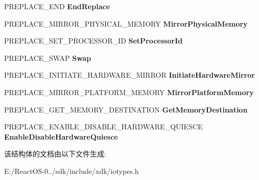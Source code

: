\begin{DoxyCompactItemize}
P\+R\+E\+P\+L\+A\+C\+E\+\_\+\+E\+ND {\bfseries End\+Replace}
\item 
\mbox{\label{struct___p_n_p___r_e_p_l_a_c_e___d_r_i_v_e_r___i_n_t_e_r_f_a_c_e_a1d3a4f853a6a4c31257f8b91adc3f37c}} 
P\+R\+E\+P\+L\+A\+C\+E\+\_\+\+M\+I\+R\+R\+O\+R\+\_\+\+P\+H\+Y\+S\+I\+C\+A\+L\+\_\+\+M\+E\+M\+O\+RY {\bfseries Mirror\+Physical\+Memory}
\item 
\mbox{\label{struct___p_n_p___r_e_p_l_a_c_e___d_r_i_v_e_r___i_n_t_e_r_f_a_c_e_a89aadae61d7ebc41005524606f802240}} 
P\+R\+E\+P\+L\+A\+C\+E\+\_\+\+S\+E\+T\+\_\+\+P\+R\+O\+C\+E\+S\+S\+O\+R\+\_\+\+ID {\bfseries Set\+Processor\+Id}
\item 
\mbox{\label{struct___p_n_p___r_e_p_l_a_c_e___d_r_i_v_e_r___i_n_t_e_r_f_a_c_e_af0740fabd446d085af9b98a923b95cd2}} 
P\+R\+E\+P\+L\+A\+C\+E\+\_\+\+S\+W\+AP {\bfseries Swap}
\item 
\mbox{\label{struct___p_n_p___r_e_p_l_a_c_e___d_r_i_v_e_r___i_n_t_e_r_f_a_c_e_a37169ec254dc5cd3442c728054108e8a}} 
P\+R\+E\+P\+L\+A\+C\+E\+\_\+\+I\+N\+I\+T\+I\+A\+T\+E\+\_\+\+H\+A\+R\+D\+W\+A\+R\+E\+\_\+\+M\+I\+R\+R\+OR {\bfseries Initiate\+Hardware\+Mirror}
\item 
\mbox{\label{struct___p_n_p___r_e_p_l_a_c_e___d_r_i_v_e_r___i_n_t_e_r_f_a_c_e_ab5ef29c254e30854eea33aa205da7b23}} 
P\+R\+E\+P\+L\+A\+C\+E\+\_\+\+M\+I\+R\+R\+O\+R\+\_\+\+P\+L\+A\+T\+F\+O\+R\+M\+\_\+\+M\+E\+M\+O\+RY {\bfseries Mirror\+Platform\+Memory}
\item 
\mbox{\label{struct___p_n_p___r_e_p_l_a_c_e___d_r_i_v_e_r___i_n_t_e_r_f_a_c_e_ae2674ae7c748c1012d53b336ea75ad0a}} 
P\+R\+E\+P\+L\+A\+C\+E\+\_\+\+G\+E\+T\+\_\+\+M\+E\+M\+O\+R\+Y\+\_\+\+D\+E\+S\+T\+I\+N\+A\+T\+I\+ON {\bfseries Get\+Memory\+Destination}
\item 
\mbox{\label{struct___p_n_p___r_e_p_l_a_c_e___d_r_i_v_e_r___i_n_t_e_r_f_a_c_e_a92cd16e05c19d30c4225fd63c20aab68}} 
P\+R\+E\+P\+L\+A\+C\+E\+\_\+\+E\+N\+A\+B\+L\+E\+\_\+\+D\+I\+S\+A\+B\+L\+E\+\_\+\+H\+A\+R\+D\+W\+A\+R\+E\+\_\+\+Q\+U\+I\+E\+S\+CE {\bfseries Enable\+Disable\+Hardware\+Quiesce}
\end{DoxyCompactItemize}


该结构体的文档由以下文件生成\+:\begin{DoxyCompactItemize}
\item 
E\+:/\+React\+O\+S-\/0../sdk/include/xdk/iotypes.\+h\end{DoxyCompactItemize}
